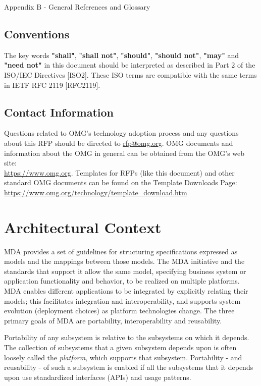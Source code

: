 Appendix B - General References and Glossary

\subsection{Conventions}

The key words \textbf{"shall"}, \textbf{"shall not"}, \textbf{"should"}, \textbf{"should not"}, \textbf{"may"} and \textbf{"need not"} in this document should be interpreted as described in Part 2 of the ISO/IEC Directives [ISO2]. These ISO terms are compatible with the same terms in IETF RFC 2119 [RFC2119].

\subsection{Contact Information}

Questions related to OMG's technology adoption process and any questions about this RFP should be directed to \href{mailto:rfp@omg.org}{rfp@omg.org}.
OMG documents and information about the OMG in general can be obtained from the OMG's web site:\\ \url{https://www.omg.org}. Templates for RFPs (like this document) and other standard OMG documents can be found on the Template Downloads Page:\\ \url{https://www.omg.org/technology/template\_download.htm}



\section{Architectural Context}

MDA provides a set of guidelines for structuring specifications expressed as models and the mappings between those models. The MDA initiative and the standards that support it allow the same model, specifying business system or application functionality and behavior, to be realized on multiple platforms. MDA enables different applications to be integrated by explicitly relating their models; this facilitates integration and interoperability, and supports system evolution (deployment choices) as platform technologies change. The three primary goals of MDA are portability, interoperability and reusability.

Portability of any subsystem is relative to the subsystems on which it depends. The collection of subsystems that a given subsystem depends upon is often loosely called the \textit{platform}, which supports that subsystem. Portability - and reusability - of such a subsystem is enabled if all the subsystems that it depends upon use standardized interfaces (APIs) and usage patterns.

